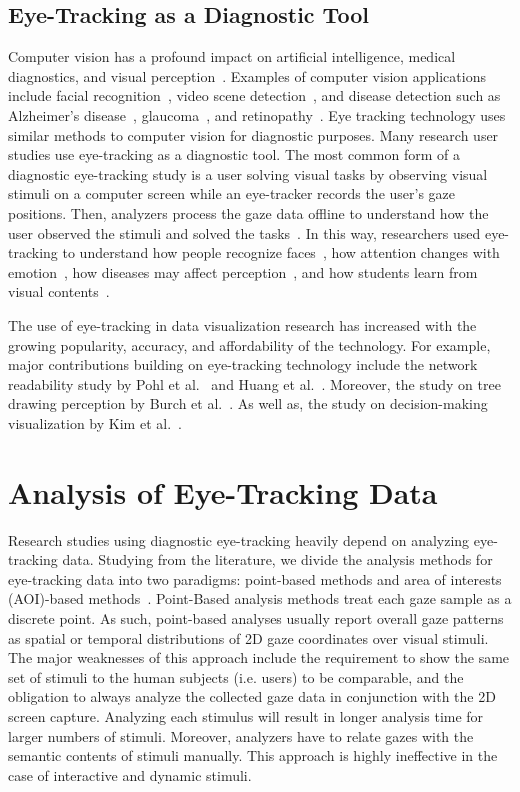\subsection{Eye-Tracking as a Diagnostic Tool}
\label{sec:EyeTrackingDiagnostic}
Computer vision has a profound impact on artificial intelligence, medical diagnostics, and visual perception~\cite{forsyth2011computer, Huang:400313}. Examples of computer vision applications include facial recognition~\cite{sirovich1987low}, video scene detection~\cite{yeo1995rapid, gao2006pca}, and disease detection such as Alzheimer's disease~\cite{chen2004automated}, glaucoma~\cite{balasubramanian2009framework}, and retinopathy~\cite{cao2011high, cao2008automated}. Eye tracking technology uses similar methods to computer vision for diagnostic purposes. Many research user studies use eye-tracking as a diagnostic tool. The most common form of a diagnostic eye-tracking study is a user solving visual tasks by observing visual stimuli on a computer screen while an eye-tracker records the user's gaze positions. Then, analyzers process the gaze data offline to understand how the user observed the stimuli and solved the tasks~\cite{Duch07}. In this way, researchers used eye-tracking to understand how people recognize faces~\cite{Guo14, Sha14}, how attention changes with emotion~\cite{Ver13}, how diseases may affect perception~\cite{Kim14}, and how students learn from visual contents~\cite{Zaw15, May10, vGo10, Con13}.

The use of eye-tracking in data visualization research has increased with the growing popularity, accuracy, and affordability of the technology. For example, major contributions building on eye-tracking technology include the network readability study by Pohl et al.~\cite{Poh09} and Huang et al.~\cite{Hua08, Hua05}. Moreover, the study on tree drawing perception by Burch et al.~\cite{Bur11, Bur13}. As well as, the study on decision-making visualization by Kim et al.~\cite{Kim12}.

\section{Analysis of Eye-Tracking Data}
Research studies using diagnostic eye-tracking heavily depend on analyzing eye-tracking data. Studying from the literature, we divide the analysis methods for eye-tracking data into two paradigms: point-based methods and area of interests (AOI)-based methods~\cite{Bla14}. Point-Based analysis methods treat each gaze sample as a discrete point. As such, point-based analyses usually report overall gaze patterns as spatial or temporal distributions of 2D gaze coordinates over visual stimuli. The major weaknesses of this approach include the requirement to show the same set of stimuli to the human subjects (i.e. users) to be comparable, and the obligation to always analyze the collected gaze data in conjunction with the 2D screen capture. Analyzing each stimulus will result in longer analysis time for larger numbers of stimuli. Moreover, analyzers have to relate gazes with the semantic contents of stimuli manually. This approach is highly ineffective in the case of interactive and dynamic stimuli.

